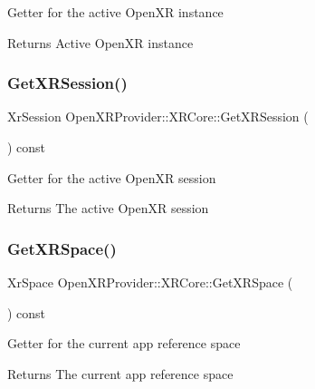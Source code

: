 Getter for the active Open\+XR instance \begin{DoxyReturn}{Returns}
Active Open\+XR instance 
\end{DoxyReturn}
\mbox{\label{class_open_x_r_provider_1_1_x_r_core_a6ceb9dd6bab3b254a0890546056068ea}} 
\subsubsection{\texorpdfstring{GetXRSession()}{GetXRSession()}}
{\footnotesize\ttfamily Xr\+Session Open\+X\+R\+Provider\+::\+X\+R\+Core\+::\+Get\+X\+R\+Session (\begin{DoxyParamCaption}{ }\end{DoxyParamCaption}) const\hspace{0.3cm}{\ttfamily [inline]}}

Getter for the active Open\+XR session \begin{DoxyReturn}{Returns}
The active Open\+XR session 
\end{DoxyReturn}
\mbox{\label{class_open_x_r_provider_1_1_x_r_core_ae09a68b60383bf9bd5866d2e7b689828}} 
\subsubsection{\texorpdfstring{GetXRSpace()}{GetXRSpace()}}
{\footnotesize\ttfamily Xr\+Space Open\+X\+R\+Provider\+::\+X\+R\+Core\+::\+Get\+X\+R\+Space (\begin{DoxyParamCaption}{ }\end{DoxyParamCaption}) const\hspace{0.3cm}{\ttfamily [inline]}}

Getter for the current app reference space \begin{DoxyReturn}{Returns}
The current app reference space 
\end{DoxyReturn}
\mbox{\label{class_open_x_r_provider_1_1_x_r_core_a2ebafdf7a4329f33f5cfb7c9d3c9b2d9}} 
